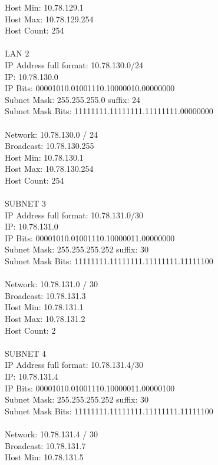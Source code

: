 \documentclass[10pt, a4paper]{article}%
\begin{document}
Host Min: 10.78.129.1\\
Host Max: 10.78.129.254\\
Host Count: 254\\
\\
LAN 2\\
IP Address full format: 10.78.130.0/24\\
IP: 10.78.130.0\\
IP Bits: 00001010.01001110.10000010.00000000\\
Subnet Mask: 255.255.255.0 suffix: 24\\
Subnet Mask Bits: 11111111.11111111.11111111.00000000\\
\\
Network: 10.78.130.0 / 24\\
Broadcast: 10.78.130.255\\
Host Min: 10.78.130.1\\
Host Max: 10.78.130.254\\
Host Count: 254\\
\\
SUBNET 3\\
IP Address full format: 10.78.131.0/30\\
IP: 10.78.131.0\\
IP Bits: 00001010.01001110.10000011.00000000\\
Subnet Mask: 255.255.255.252 suffix: 30\\
Subnet Mask Bits: 11111111.11111111.11111111.11111100\\
\\
Network: 10.78.131.0 / 30\\
Broadcast: 10.78.131.3\\
Host Min: 10.78.131.1\\
Host Max: 10.78.131.2\\
Host Count: 2\\
\\
SUBNET 4\\
IP Address full format: 10.78.131.4/30\\
IP: 10.78.131.4\\
IP Bits: 00001010.01001110.10000011.00000100\\
Subnet Mask: 255.255.255.252 suffix: 30\\
Subnet Mask Bits: 11111111.11111111.11111111.11111100\\
\\
Network: 10.78.131.4 / 30\\
Broadcast: 10.78.131.7\\
Host Min: 10.78.131.5\\
\end{document}
